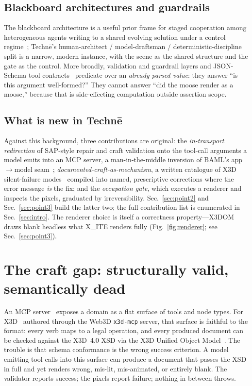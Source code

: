 \documentclass[sigconf,nonacm,screen,anonymous]{acmart}
\begin{document}
\subsection{Blackboard architectures and guardrails}
The blackboard architecture is a useful prior frame for staged cooperation among heterogeneous agents writing to a shared evolving solution under a control regime~\cite{blackboard}; Technē's human-architect / model-draftsman / deterministic-discipline split is a narrow, modern instance, with the scene as the shared structure and the gate as the control. More broadly, validation and guardrail layers and JSON-Schema tool contracts~\cite{jsonschema} predicate over an \emph{already-parsed value}: they answer ``is this argument well-formed?'' They cannot answer ``did the moose render as a moose,'' because that is side-effecting computation outside assertion scope.

\subsection{What is new in Technē}
Against this background, three contributions are original: the \emph{in-transport redirection} of SAP-style repair and craft validation onto the tool-call arguments a model emits into an MCP server, a man-in-the-middle inversion of BAML's app$\rightarrow$model seam~\cite{baml,mcp}; \emph{documented-craft-as-mechanism}, a written catalogue of X3D silent-failure modes~\cite{x3dpy} compiled into named, prescriptive corrections where the error message \emph{is} the fix; and the \emph{occupation gate}, which executes a renderer and inspects the pixels, graduated by irreversibility. Sec.~\ref{sec:point2} and Sec.~\ref{sec:point3} build the latter two; the full contribution list is enumerated in Sec.~\ref{sec:intro}. The renderer choice is itself a correctness property---X3DOM draws blank headless what X\_ITE renders fully (Fig.~\ref{fig:renderer}; see Sec.~\ref{sec:point3}).

\section{The craft gap: structurally valid, semantically dead}\label{sec:gap}

An MCP server~\cite{mcp} exposes a domain as a flat surface of tools and node types. For X3D~\cite{x3d4} authored through the Web3D \texttt{x3d-mcp} server, that surface is faithful to the format: every verb maps to a legal operation, and every produced document can be checked against the X3D~4.0 XSD via the X3D Unified Object Model~\cite{x3duom}. The trouble is that schema conformance is the wrong success criterion. A model emitting tool calls into this surface can produce a document that passes the XSD in full and yet renders wrong, mis-lit, mis-animated, or entirely blank. The validator reports success; the pixels report failure; nothing in between throws.
\end{document}
